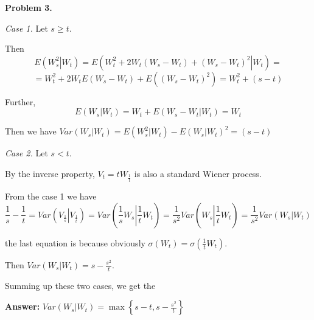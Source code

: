 \documentclass[12pt, a4paper]{article}
\newcommand{\ds}{\displaystyle}
\begin{document}
\textbf{Problem 3.}\par
\textit{Case 1.} Let $s \geqslant t$.\par
Then
$$
E\left(\left.W_{s}^{2}\right| W_{t}\right) = E\left(\left.W_{t}^{2} + 2 W_{t}(W_{s} - W_{t}) + (W_{s} - W_{t})^{2} \right| W_{t}\right) =$$ $$= W_{t}^{2} + 2W_{t}E(W_{s} - W_{t}) + E\left((W_{s} - W_{t})^{2}\right) = W_{t}^{2} + (s-t)
$$\par
Further,
$$
E(W_{s} | W_{t}) = W_{t} + E(W_{s} - W_{t}| W_{t}) = W_{t}
$$
\par
Then we have $Var(W_{s}|W_{t}) = E(W_{s}^{2}| W_{t}) - E(W_{s}|W_{t})^{2} = (s-t)$\[\]\par
\textit{Case 2.} Let $s < t$.\par
By the inverse property, $V_{t} = tW_{\frac{1}{t}}$ is also a standard Wiener process.\par
From the case 1 we have
$$
\frac{\ds 1}{\ds s} - \frac{\ds 1}{\ds t} = Var\left(\left.V_{\frac{1}{s}}\right| V_{\frac{1}{t}}\right) = Var\left(\left.\frac{\ds 1}{\ds s}W_{s}\right| \frac{\ds 1}{\ds t}W_{t}\right) = \frac{\ds 1}{\ds s^{2}} Var\left(W_{s}\left|\frac{\ds 1}{\ds t}\right.W_{t}\right) = \frac{\ds 1}{\ds s^{2}}Var(W_{s}| W_{t})
$$\par
the last equation is because obviously $\sigma(W_{t}) = \sigma\left(\frac{\ds 1}{\ds t}W_{t}\right)$.\par
Then $Var(W_{s}| W_{t}) = s - \frac{\ds s^{2}}{\ds t}$.\[\]\par
Summing up these two cases, we get the\[\]\par
\textbf{Answer:} $Var(W_{s}| W_{t}) = \max\left\{s-t, s - \frac{\ds s^{2}}{\ds t}\right\}$
\end{document}

